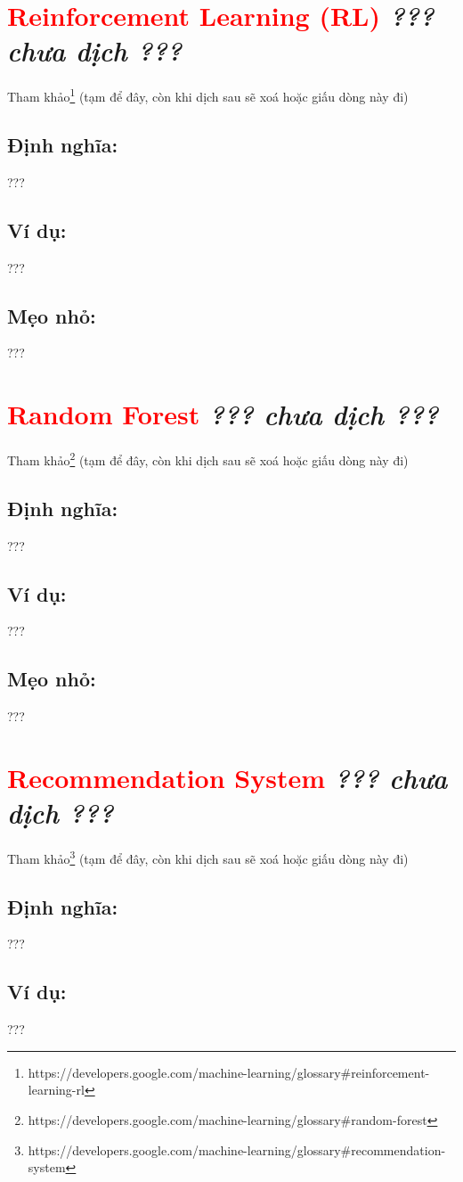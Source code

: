 \section*{\huge \textcolor{Red}{Reinforcement Learning (RL)}  \small \textit{??? chưa dịch ???} }
Tham khảo\footnote{https://developers.google.com/machine-learning/glossary\#reinforcement-learning-rl} (tạm để đây, còn khi dịch sau sẽ xoá hoặc giấu dòng này đi)
\subsection*{Định nghĩa:}
???
\subsection*{Ví dụ:}
???
\subsection*{Mẹo nhỏ:}
???
\section*{\huge \textcolor{Red}{Random Forest}  \small \textit{??? chưa dịch ???} }
Tham khảo\footnote{https://developers.google.com/machine-learning/glossary\#random-forest} (tạm để đây, còn khi dịch sau sẽ xoá hoặc giấu dòng này đi)
\subsection*{Định nghĩa:}
???
\subsection*{Ví dụ:}
???
\subsection*{Mẹo nhỏ:}
???
\section*{\huge \textcolor{Red}{Recommendation System}  \small \textit{??? chưa dịch ???} }
Tham khảo\footnote{https://developers.google.com/machine-learning/glossary\#recommendation-system} (tạm để đây, còn khi dịch sau sẽ xoá hoặc giấu dòng này đi)
\subsection*{Định nghĩa:}
???
\subsection*{Ví dụ:}
???
